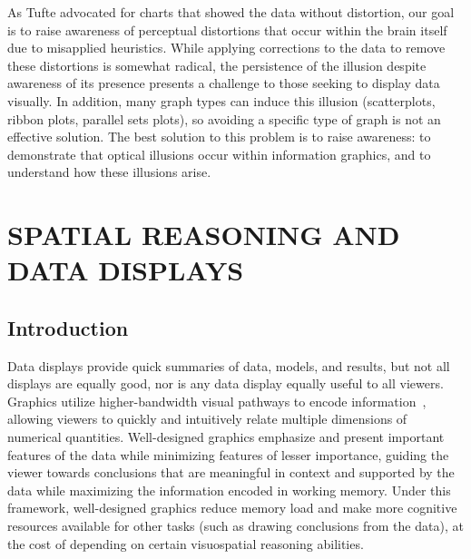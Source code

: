 \documentclass[11pt]{isuthesis}\usepackage[]{graphicx}\usepackage[]{color}
\begin{document}
As Tufte advocated for charts that showed the data without distortion, our goal is to raise awareness of perceptual distortions that occur within the brain itself due to misapplied heuristics. While applying corrections to the data to remove these distortions is somewhat radical, the persistence of the illusion despite awareness of its presence presents a challenge to those seeking to display data visually. In addition, many graph types can induce this illusion (scatterplots, ribbon plots, parallel sets plots), so avoiding a specific type of graph is not an effective solution. The best solution to this problem is to raise awareness: to demonstrate that optical illusions occur within information graphics, and to understand how these illusions arise.  













\graphicspath{{Figure/VisualAptitude/}{../Figure/VisualAptitude/}{Images/VisualAptitude/}{../Images/VisualAptitude/}}
\renewcommand{\floatpagefraction}{.99}




\chapter{SPATIAL REASONING AND DATA DISPLAYS}\label{VisualAptitude}\label{visualreasoning}

\section{Introduction}
Data displays provide quick summaries of data, models, and results, but not all displays are equally good, nor is any data display equally useful to all viewers. 
Graphics utilize higher-bandwidth visual pathways to encode information~\citep{baddeley1974working}, allowing viewers to quickly and intuitively relate multiple dimensions of numerical quantities.
Well-designed graphics emphasize and present important features of the data while minimizing  features of lesser importance, guiding the viewer towards conclusions that are meaningful in context and supported by the data while maximizing the information encoded in working memory. Under this framework, well-designed graphics reduce memory load and make more cognitive resources available for other tasks (such as drawing conclusions from the data), at the cost of depending on certain visuospatial reasoning abilities. 
\end{document}
